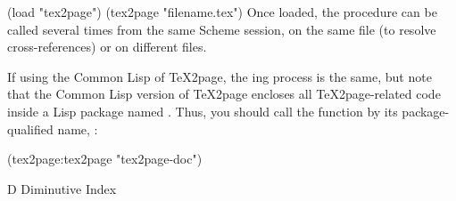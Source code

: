 \begintts
(load "tex2page")
(tex2page "filename.tex")
\endtt
Once loaded, the procedure  can be called several times from
the same Scheme session, on the same file (to resolve cross-references)
or on different files.

If using the Common Lisp of \TeX2page, the ing process is the same, but note that
the Common Lisp version of \TeX2page encloses all \TeX2page-related code
inside a Lisp package named .  Thus, you should call the
function  by its package-qualified name, :

\begintts
(tex2page:tex2page "tex2page-doc")
\endtt

%
%

\fi

\beginchapter  D Diminutive Index




\endmulticols


\bye
